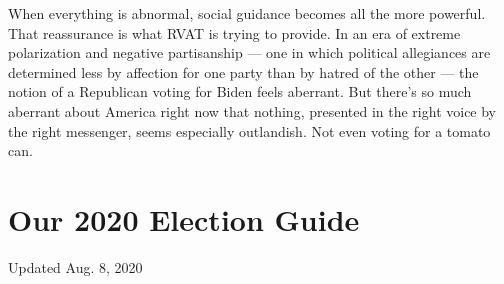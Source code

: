 When everything is abnormal, social guidance becomes all the more
powerful. That reassurance is what RVAT is trying to provide. In an era
of extreme polarization and negative partisanship --- one in which
political allegiances are determined less by affection for one party
than by hatred of the other --- the notion of a Republican voting for
Biden feels aberrant. But there's so much aberrant about America right
now that nothing, presented in the right voice by the right messenger,
seems especially outlandish. Not even voting for a tomato can.

\hypertarget{our-2020-election-guide}{%
\section{Our 2020 Election Guide}\label{our-2020-election-guide}}

Updated Aug. 8, 2020

